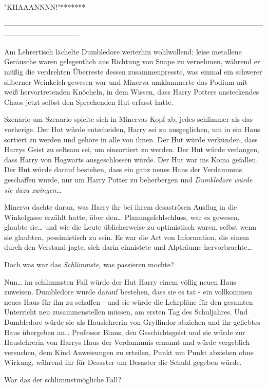{"KHAAANNNN!"*******

--------------------------------------------------------------------------------------------------------------------------------------------

Am Lehrertisch lächelte Dumbledore weiterhin wohlwollend; leise metallene Geräusche waren gelegentlich aus Richtung von Snape zu vernehmen, während er müßig die verdrehten Überreste dessen zusammenpresste, was einmal ein schwerer silberner Weinkelch gewesen war und Minerva umklammerte das Podium mit weiß hervortretenden Knöcheln, in dem Wissen, dass Harry Potters ansteckendes Chaos jetzt selbst den Sprechenden Hut erfasst hatte.

Szenario um Szenario spielte sich in Minervas Kopf ab, jedes schlimmer als das vorherige. Der Hut würde entscheiden, Harry sei zu ausgeglichen, um in ein Haus sortiert zu werden und gehöre in alle von ihnen. Der Hut würde verkünden, dass Harrys Geist zu seltsam sei, um einsortiert zu werden. Der Hut würde verlangen, dass Harry von Hogwarts ausgeschlossen würde. Der Hut war ins Koma gefallen. Der Hut würde darauf bestehen, dass ein ganz neues Haus der Verdammnis geschaffen wurde, nur um Harry Potter zu beherbergen und \emph{Dumbledore würde sie dazu zwingen…}

Minerva dachte daran, was Harry ihr bei ihrem desaströsen Ausflug in die Winkelgasse erzählt hatte, über den… Planungsfehlschluss, war es gewesen, glaubte sie… und wie die Leute üblicherweise zu optimistisch waren, selbst wenn sie glaubten, pessimistisch zu sein. Es war die Art von Information, die einem durch den Verstand jagte, sich darin einnistete und Alpträume hervorbrachte…

Doch was war das \emph{Schlimmste,} was passieren mochte?

Nun… im schlimmsten Fall würde der Hut Harry einem völlig neuen Haus zuweisen. Dumbledore würde darauf bestehen, dass sie es tat - ein vollkommen neues Haus für ihn zu schaffen - und sie würde die Lehrpläne für den gesamten Unterricht neu zusammenstellen müssen, am ersten Tag des Schuljahres. Und Dumbledore würde sie als Hauslehrerin von Gryffindor abziehen und ihr geliebtes Haus übergeben an… Professor Binns, den Geschichtsgeist und sie würde zur Hauslehrerin von Harrys Haus der Verdammnis ernannt und würde vergeblich versuchen, dem Kind Anweisungen zu erteilen, Punkt um Punkt abziehen ohne Wirkung, während ihr für Desaster um Desaster die Schuld gegeben würde.

War das der schlimmstmögliche Fall?

}
